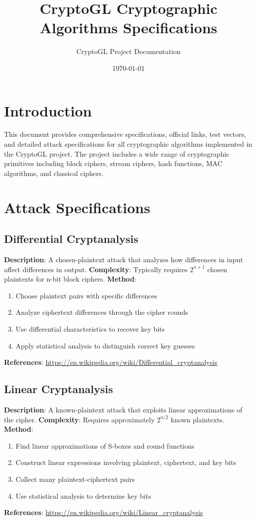 \documentclass[11pt,a4paper]{article}
\title{\textbf{CryptoGL Cryptographic Algorithms Specifications}}
\author{CryptoGL Project Documentation}
\date{\today}
\begin{document}
\maketitle
\tableofcontents
\newpage

\section{Introduction}

This document provides comprehensive specifications, official links, test vectors, and detailed attack specifications for all cryptographic algorithms implemented in the CryptoGL project. The project includes a wide range of cryptographic primitives including block ciphers, stream ciphers, hash functions, MAC algorithms, and classical ciphers.

\section{Attack Specifications}

\subsection{Differential Cryptanalysis}
\textbf{Description}: A chosen-plaintext attack that analyzes how differences in input affect differences in output.
\textbf{Complexity}: Typically requires $2^{n+1}$ chosen plaintexts for n-bit block ciphers.
\textbf{Method}: 
\begin{enumerate}
    \item Choose plaintext pairs with specific differences
    \item Analyze ciphertext differences through the cipher rounds
    \item Use differential characteristics to recover key bits
    \item Apply statistical analysis to distinguish correct key guesses
\end{enumerate}
\textbf{References}: \url{https://en.wikipedia.org/wiki/Differential_cryptanalysis}

\subsection{Linear Cryptanalysis}
\textbf{Description}: A known-plaintext attack that exploits linear approximations of the cipher.
\textbf{Complexity}: Requires approximately $2^{n/2}$ known plaintexts.
\textbf{Method}:
\begin{enumerate}
    \item Find linear approximations of S-boxes and round functions
    \item Construct linear expressions involving plaintext, ciphertext, and key bits
    \item Collect many plaintext-ciphertext pairs
    \item Use statistical analysis to determine key bits
\end{enumerate}
\textbf{References}: \url{https://en.wikipedia.org/wiki/Linear_cryptanalysis}
\end{document}

